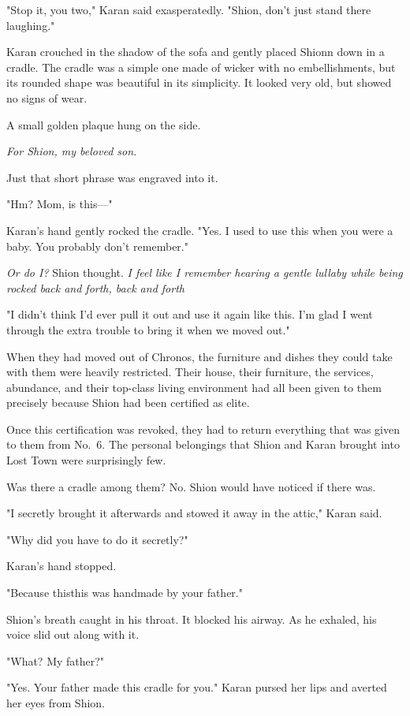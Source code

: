 "Stop it, you two," Karan said exasperatedly. "Shion, don't just stand
there laughing."

Karan crouched in the shadow of the sofa and gently placed Shionn down
in a cradle. The cradle was a simple one made of wicker with no
embellishments, but its rounded shape was beautiful in its simplicity.
It looked very old, but showed no signs of wear.

A small golden plaque hung on the side.

\emph{For Shion, my beloved son.}

Just that short phrase was engraved into it.

"Hm? Mom, is this---"

Karan's hand gently rocked the cradle. "Yes. I used to use this when you
were a baby. You probably don't remember."

\emph{Or do I?} Shion thought. \emph{I feel like I remember hearing a gentle
lullaby while being rocked back and forth, back and forth\el }

"I didn't think I'd ever pull it out and use it again like this. I'm
glad I went through the extra trouble to bring it when we moved out."

When they had moved out of Chronos, the furniture and dishes they could
take with them were heavily restricted. Their house, their furniture,
the services, abundance, and their top-class living environment had all
been given to them precisely because Shion had been certified as elite.

Once this certification was revoked, they had to return everything that
was given to them from No.~6. The personal belongings that Shion and
Karan brought into Lost Town were surprisingly few.

Was there a cradle among them? No. Shion would have noticed if there
was.

"I secretly brought it afterwards and stowed it away in the attic,"
Karan said.

"Why did you have to do it secretly?"

Karan's hand stopped.

"Because this\el this was handmade by your father."

Shion's breath caught in his throat. It blocked his airway. As he
exhaled, his voice slid out along with it.

"What? My father?"

"Yes. Your father made this cradle for you." Karan pursed her lips and
averted her eyes from Shion.

